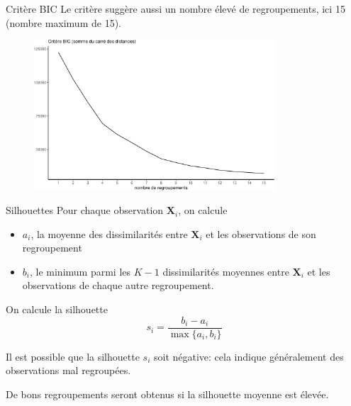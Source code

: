 \documentclass[
  ignorenonframetext,
]{beamer}
\providecommand{\tightlist}{%
  \setlength{\itemsep}{0pt}\setlength{\parskip}{0pt}}\usepackage{longtable,booktabs,array}
\begin{document}
\begin{frame}{Critère BIC}
\protect\hypertarget{crituxe8re-bic}{}
Le critère suggère aussi un nombre élevé de regroupements, ici 15
(nombre maximum de 15).

\begin{figure}

{\centering \includegraphics[width=0.8\textwidth,height=\textheight]{MATH60602-diapos11_files/figure-beamer/unnamed-chunk-17-1.pdf}

}

\end{figure}
\end{frame}

\begin{frame}{Silhouettes}
\protect\hypertarget{silhouettes}{}
Pour chaque observation \(\mathbf{X}_i\), on calcule

\begin{itemize}
\tightlist
\item
  \(a_i\), la moyenne des dissimilarités entre \(\mathbf{X}_i\) et les
  observations de son regroupement
\item
  \(b_i\), le minimum parmi les \(K-1\) dissimilarités moyennes entre
  \(\mathbf{X}_i\) et les observations de chaque autre regroupement.
\end{itemize}

On calcule la silhouette \[s_i=\frac{b_i-a_i}{\max\{a_i, b_i\}}\]

Il est possible que la silhouette \(s_i\) soit négative: cela indique
généralement des observations mal regroupées.

De bons regroupements seront obtenus si la silhouette moyenne est
élevée.
\end{frame}
\end{document}
